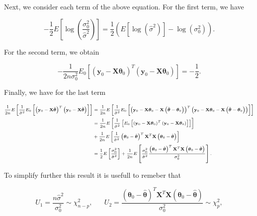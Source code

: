 \documentclass[]{book}
\theoremstyle{definition}
\theoremstyle{definition}
\theoremstyle{definition}
\theoremstyle{remark}
\begin{document}
{Next, we consider each term of the above equation. For the first term,
we have

\[
-\frac{1}{2} E \left[\log \left( {\frac{{\sigma _0^2}}{{\hat{\sigma}^2}}} \right)\right] = 
\frac{1}{2} \left(E \left[ \log \left( \hat{\sigma}^2 \right) \right] - \log \left( \sigma_0^2 \right)\right).
\]

For the second term, we obtain

\[ -\frac{1}{{2n\sigma _0^2}} {E_0}\left[ {{{\left( {\mathbf{y}_0 - \mathbf{X}{\boldsymbol{\theta}_0}} \right)}^T}\left( {\mathbf{y}_0 - \mathbf{X}{\boldsymbol{\theta}_0}} \right)} \right] = -\frac{1}{2}. \]

Finally, we have for the last term

\[\scriptsize \begin{aligned}
\frac{1}{{2n}} {E}\left[ \frac{1}{\hat{\sigma}^2} {E_0}\left[ {{{\left( {\mathbf{y}_0 - \mathbf{X}{\hat{\boldsymbol{\theta}}}} \right)}^T}\left( {\mathbf{y}_0 - \mathbf{X}\hat{\boldsymbol{\theta}}} \right)} \right]\right]
   &=  \frac{1}{{2n}} {E}\left[ \frac{1}{\hat{\sigma}^2} {E_0}\left[ {{{\left( {\mathbf{y}_0 - \mathbf{X} \boldsymbol{\theta}_0 - \mathbf{X}\left( {\hat{\boldsymbol{\theta}} - \boldsymbol{\theta}_0} \right)} \right)}^T}\left( {\mathbf{y}_0 - \mathbf{X} \boldsymbol{\theta}_0 - \mathbf{X}\left( {\hat{\boldsymbol{\theta}} - \boldsymbol{\theta}_0} \right)} \right)} \right] \right] \\
   &= \frac{1}{{2n}} E\left[  \frac{1}{\hat{\sigma}^2}  \left[ {E_0}\left[ {{{\left( {\mathbf{y}_0 - \mathbf{X} \boldsymbol{\theta}_0} \right)}^T}\left( {\mathbf{y}_0 - \mathbf{X} \boldsymbol{\theta}_0} \right)} \right]\right] \right]\\
   &+ \frac{1}{{2n}} E \left[ \frac{1}{\hat{\sigma}^2}  \left( \boldsymbol{\theta}_0 - \hat{\boldsymbol{\theta}} \right)^T \mathbf{X}^T \mathbf{X}\left( \boldsymbol{\theta}_0 - \hat{\boldsymbol{\theta}} \right)\right]\\
   &= \frac{1}{{2}} E \left[ \frac{\sigma_0^2}{\hat{\sigma}^2} \right]
   + \frac{1}{{2n}} E \left[ \frac{\sigma_0^2}{\hat{\sigma}^2}  \frac{\left( \boldsymbol{\theta}_0 - \hat{\boldsymbol{\theta}} \right)^T \mathbf{X}^T \mathbf{X}\left( \boldsymbol{\theta}_0 - \hat{\boldsymbol{\theta}} \right)}{\sigma_0^2}\right].\\
\end{aligned}\]

To simplify further this result it is usefull to remeber that

\[
U_1 = \frac{n \hat{\sigma}^2}{\sigma_0^2} \sim \chi^2_{n-p}, \;\;\;\;\;\;
U_2 = \frac{\left( \boldsymbol{\theta}_0 - \hat{\boldsymbol{\theta}} \right)^T \mathbf{X}^T \mathbf{X}\left( \boldsymbol{\theta}_0 - \hat{\boldsymbol{\theta}} \right)}{\sigma_0^2} \sim \chi^2_p,
\]

}
\end{document}
